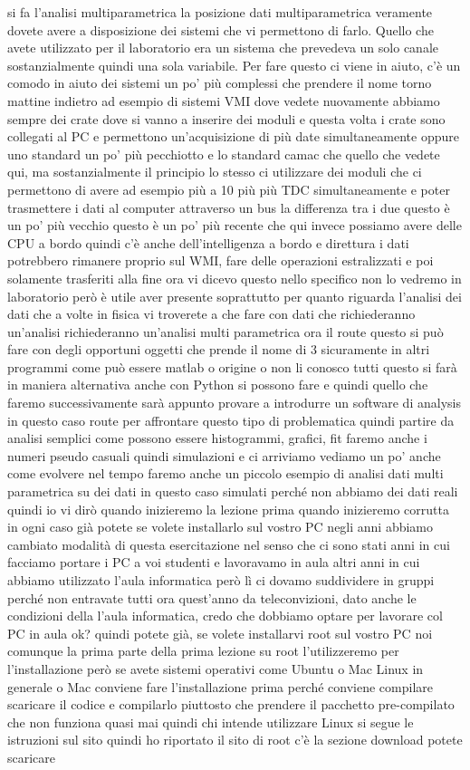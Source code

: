 si fa l'analisi multiparametrica la posizione dati multiparametrica veramente dovete avere a disposizione dei sistemi che vi permettono di farlo. Quello che avete utilizzato per il laboratorio era un sistema che prevedeva un solo canale sostanzialmente quindi una sola variabile. Per fare questo ci viene in aiuto, c'è un comodo in aiuto dei sistemi un po' più complessi che prendere il nome torno mattine indietro ad esempio di sistemi VMI dove vedete nuovamente abbiamo sempre dei crate dove si vanno a inserire dei moduli e questa volta i crate sono collegati al PC e permettono un'acquisizione di più date simultaneamente oppure uno standard un po' più pecchiotto e lo standard camac che quello che vedete qui, ma sostanzialmente il principio lo stesso ci utilizzare dei moduli che ci permettono di avere ad esempio più a 10 più più TDC simultaneamente e poter trasmettere i dati al computer attraverso un bus la differenza tra i due questo è un po' più vecchio questo è un po' più recente che qui invece possiamo avere delle CPU a bordo quindi c'è anche dell'intelligenza a bordo e direttura i dati potrebbero rimanere proprio sul WMI, fare delle operazioni estralizzati e poi solamente trasferiti alla fine ora vi dicevo questo nello specifico non lo vedremo in laboratorio però è utile aver presente soprattutto per quanto riguarda l'analisi dei dati che a volte in fisica vi troverete a che fare con dati che richiederanno un'analisi richiederanno un'analisi multi parametrica ora il route questo si può fare con degli opportuni oggetti che prende il nome di 3 sicuramente in altri programmi come può essere matlab o origine o non li conosco tutti questo si farà in maniera alternativa anche con Python si possono fare e quindi quello che faremo successivamente sarà appunto provare a introdurre un software di analysis in questo caso route per affrontare questo tipo di problematica quindi partire da analisi semplici come possono essere histogrammi, grafici, fit faremo anche i numeri pseudo casuali quindi simulazioni e ci arriviamo vediamo un po' anche come evolvere nel tempo faremo anche un piccolo esempio di analisi dati multi parametrica su dei dati in questo caso simulati perché non abbiamo dei dati reali quindi io vi dirò quando inizieremo la lezione prima quando inizieremo corrutta in ogni caso già potete se volete installarlo sul vostro PC negli anni abbiamo cambiato modalità di questa esercitazione nel senso che ci sono stati anni in cui facciamo portare i PC a voi studenti e lavoravamo in aula altri anni in cui abbiamo utilizzato l'aula informatica però lì ci dovamo suddividere in gruppi perché non entravate tutti ora quest'anno da teleconvizioni, dato anche le condizioni della l'aula informatica, credo che dobbiamo optare per lavorare col PC in aula ok? quindi potete già, se volete installarvi root sul vostro PC noi comunque la prima parte della prima lezione su root l'utilizzeremo per l'installazione però se avete sistemi operativi come Ubuntu o Mac Linux in generale o Mac conviene fare l'installazione prima perché conviene compilare scaricare il codice e compilarlo piuttosto che prendere il pacchetto pre-compilato che non funziona quasi mai quindi chi intende utilizzare Linux si segue le istruzioni sul sito quindi ho riportato il sito di root c'è la sezione download potete scaricare 
